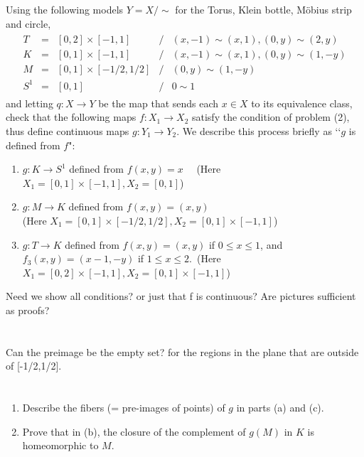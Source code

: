 \documentclass{jhwhw}
\begin{document}
\problem{}%
Using the following models $Y = X/\sim$ for the Torus, Klein bottle, M\"obius strip and circle,	
\begin{eqnarray*}
	\begin{array}{ccccl}
		T & = & [0,2]\times [-1,1] & / & (x,-1)\sim (x,1), (0,y)\sim (2,y)\\
		K & = & [0,1]\times [-1,1]  & / & (x,-1) \sim (x,1), (0,y)\sim (1,-y)\\
		M & = & [0,1]\times [-1/2,1/2] & / & (0,y)\sim (1,-y)\\
		S^1 & = & [0,1] & / & 0\sim 1
	\end{array}
\end{eqnarray*}
and letting $q:X\to Y$ be the map that sends each $x\in X$ to its equivalence class,
check that the following maps $f:X_1\to X_2$ satisfy the condition of problem (2), thus define continuous maps $g:Y_1\to Y_2$.  We describe this process briefly  as  \lq\lq $g$ is defined from $f$":
\begin{enumerate}
	
	\item $g: K \to S^1$ defined from $ f(x,y) = x$ \ \ (Here $X_1= [0,1]\times [-1,1] , X_2 = [0,1]$)
	\item $g: M \to K$ defined from $f (x,y) = (x,y)$ \\ (Here $X_1= [0,1]\times [-1/2,1/2] ,X_2 = [0,1]\times [-1,1]$)
	\item $g:T\to K$ defined from $f(x,y) = (x,y)$ if $0\le x\le 1$, and $f_3(x,y) = (x-1,-y)$ if $1\le x\le 2$.\  (Here $X_1 = [0,2]\times [-1,1], X_2 = [0,1]\times [-1,1] $)
\end{enumerate}
\solution{}
Need we show all conditions? or just that f is continuous?
Are pictures sufficient as proofs?

\part{}%


\part{}%
Can the preimage be the empty set? for the regions in the plane that are outside of [-1/2,1/2].

\part{}%


\problem{}%
\begin{enumerate}
	\item Describe the fibers (= pre-images of points) of $g$  in parts (a) and (c).
	\item Prove that in (b),  the closure of the complement of $g(M)$ in $K$  is homeomorphic to $M$.
	
\end{enumerate}
\solution{}
\end{document}
